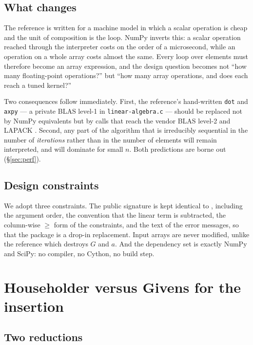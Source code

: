 \documentclass[11pt,a4paper]{article}
\theoremstyle{plain}
\theoremstyle{remark}
\begin{document}
\subsection{What changes}

The reference is written for a machine model in which a scalar operation is
cheap and the unit of composition is the loop. NumPy inverts this: a scalar
operation reached through the interpreter costs on the order of a microsecond,
while an operation on a whole array costs almost the same. Every loop over
elements must therefore become an array expression, and the design question
becomes not ``how many floating-point operations?'' but ``how many array
operations, and does each reach a tuned kernel?''

Two consequences follow immediately. First, the reference's hand-written
\texttt{dot} and \texttt{axpy} --- a private BLAS level-1 \citep{blas1979} in
\texttt{linear-algebra.c} --- should be replaced not by NumPy equivalents but by
calls that reach the vendor BLAS level-2 \citep{blas2level} and LAPACK
\citep{lapack1999}. Second, any part of the algorithm that is irreducibly
sequential in the number of \emph{iterations} rather than in the number of
elements will remain interpreted, and will dominate for small $n$. Both
predictions are borne out (\S\ref{sec:perf}).

\subsection{Design constraints}

We adopt three constraints. The public signature is kept identical to
\citep{quadprogpy}, including the argument order, the convention that the linear
term is subtracted, the column-wise $\ge$ form of the constraints, and the text
of the error messages, so that the package is a drop-in replacement. Input arrays
are never modified, unlike the reference which destroys $G$ and $a$. And the
dependency set is exactly NumPy and SciPy: no compiler, no Cython, no build step.

\section{Householder versus Givens for the insertion}
\label{sec:invariance}

\subsection{Two reductions}
\end{document}
